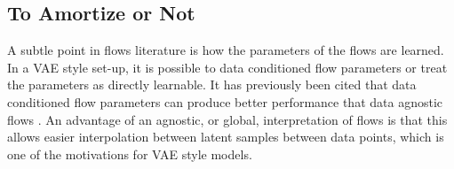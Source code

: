 \subsection{To Amortize or Not}

A subtle point in flows literature is how the parameters of the flows are learned. In a \ac{VAE} style set-up, it is possible to data conditioned flow parameters or treat the parameters as directly learnable. It has previously been cited that data conditioned flow parameters can produce better performance that data agnostic flows \cite{vdberg2018sylvester}. An advantage of an agnostic, or global, interpretation of flows is that this allows easier interpolation between latent samples between data points, which is one of the motivations for \ac{VAE} style models. 

